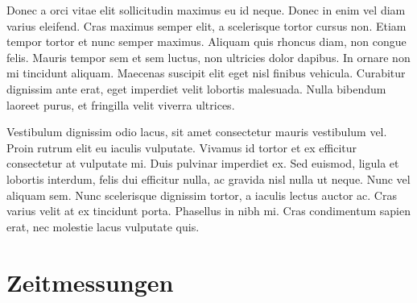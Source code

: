 \documentclass[12pt, a4paper, titlepage, hidelinks]{scrreprt}
\begin{document}
Donec a orci vitae elit sollicitudin maximus eu id neque. Donec in enim vel diam varius eleifend. Cras maximus semper elit, a scelerisque tortor cursus non. Etiam tempor tortor et nunc semper maximus. Aliquam quis rhoncus diam, non congue felis. Mauris tempor sem et sem luctus, non ultricies dolor dapibus. In ornare non mi tincidunt aliquam. Maecenas suscipit elit eget nisl finibus vehicula. Curabitur dignissim ante erat, eget imperdiet velit lobortis malesuada. Nulla bibendum laoreet purus, et fringilla velit viverra ultrices.

Vestibulum dignissim odio lacus, sit amet consectetur mauris vestibulum vel. Proin rutrum elit eu iaculis vulputate. Vivamus id tortor et ex efficitur consectetur at vulputate mi. Duis pulvinar imperdiet ex. Sed euismod, ligula et lobortis interdum, felis dui efficitur nulla, ac gravida nisl nulla ut neque. Nunc vel aliquam sem. Nunc scelerisque dignissim tortor, a iaculis lectus auctor ac. Cras varius velit at ex tincidunt porta. Phasellus in nibh mi. Cras condimentum sapien erat, nec molestie lacus vulputate quis. 

\chapter{Zeitmessungen}


\end{document}
